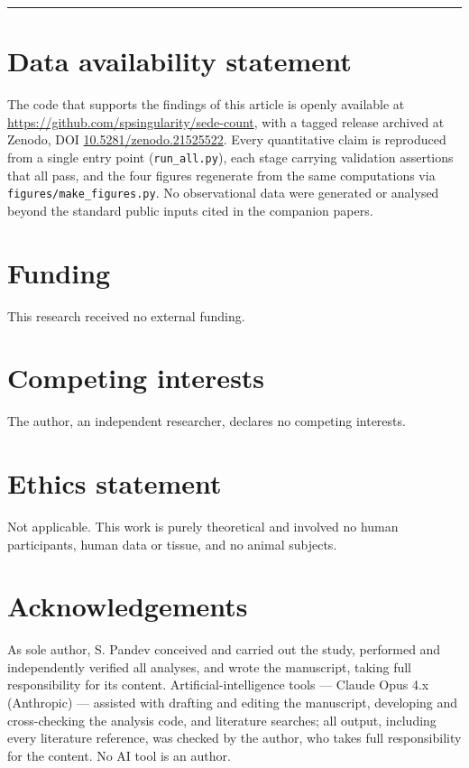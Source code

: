\documentclass[aps,prd,preprint,nofootinbib,superscriptaddress]{revtex4-2}
\begin{document}
\begin{center}\rule{0.5\linewidth}{0.5pt}\end{center}

\section*{Data availability
statement}\label{data-availability-statement}

The code that supports the findings of this article is openly available
at \url{https://github.com/spsingularity/sede-count}, with a tagged
release archived at Zenodo, DOI
\href{https://doi.org/10.5281/zenodo.21525522}{10.5281/zenodo.21525522}.
Every quantitative claim is reproduced from a single entry point
(\texttt{run\_\allowbreak all.\allowbreak py}), each stage carrying validation assertions that
all pass, and the four figures regenerate from the same computations via
\texttt{figures/\allowbreak make\_\allowbreak figures.\allowbreak py}. No observational data were generated
or analysed beyond the standard public inputs cited in the companion
papers.

\section*{Funding}\label{funding}

This research received no external funding.

\section*{Competing interests}\label{competing-interests}

The author, an independent researcher, declares no competing interests.

\section*{Ethics statement}\label{ethics-statement}

Not applicable. This work is purely theoretical and involved no human
participants, human data or tissue, and no animal subjects.

\section*{Acknowledgements}\label{acknowledgements}

As sole author, S. Pandev conceived and carried out the study, performed
and independently verified all analyses, and wrote the manuscript,
taking full responsibility for its content. Artificial-intelligence
tools --- Claude Opus 4.x (Anthropic) --- assisted with drafting and
editing the manuscript, developing and cross-checking the analysis code,
and literature searches; all output, including every literature
reference, was checked by the author, who takes full responsibility for
the content. No AI tool is an author.



\end{document}
